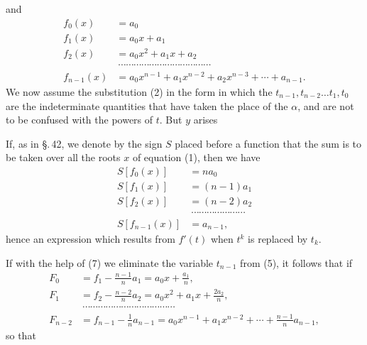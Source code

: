 and
\begin{align*}
f_0(x) &= a_0\\
f_1(x) &= a_0 x + a_1\\
f_2(x) &= a_0 x^2 + a_1 x + a_2 \tag{4}\\
&\ \cdots\cdots\cdots\cdots\cdots\cdots\cdots\cdots\cdots\cdots\cdots\cdots\\
f_{n-1}(x) &= a_0 x^{n-1} + a_1 x^{n-2} + a_2 x^{n-3} + \cdots + a_{n-1}.
\end{align*}
We now assume the substitution (2) in the form
in which the $t_{n-1}, t_{n-2} \ldots t_1, t_0$ are the indeterminate quantities
that have taken the place of the $\alpha$, and are not to be confused
with the powers of $t$. But $y$ arises 

If, as in \S.\,42, we denote by the sign $S$ placed before
a function that the sum is to be taken over all the roots
$x$ of equation (1), then we have
\begin{align*}
S[f_0(x)] &= n a_0\\
S[f_1(x)] &= (n-1) a_1\\
S[f_2(x)] &= (n-2) a_2 \tag{6}\\
&\ \cdots\cdots\cdots\cdots\cdots\cdots\cdots\\
S[f_{n-1}(x)] &= a_{n-1},
\end{align*}
hence
an expression which results from $f'(t)$ when $t^k$ is replaced
by $t_k$.

If with the help of (7) we eliminate the variable $t_{n-1}$ from (5),
it follows that
if
\begin{align*}
F_0 &= f_1 - \frac{n-1}{n} a_1 = a_0 x + \frac{a_1}{n},\\
F_1 &= f_2 - \frac{n-2}{n} a_2 = a_0 x^2 + a_1 x + \frac{2 a_2}{n}, \tag{9}\\
&\ \cdots\cdots\cdots\cdots\cdots\cdots\cdots\cdots\cdots\cdots\cdots\cdots\\
F_{n-2} &= f_{n-1} - \frac{1}{n} a_{n-1} = a_0 x^{n-1} + a_1 x^{n-2} + \cdots + \frac{n-1}{n} a_{n-1},
\end{align*}
so that
